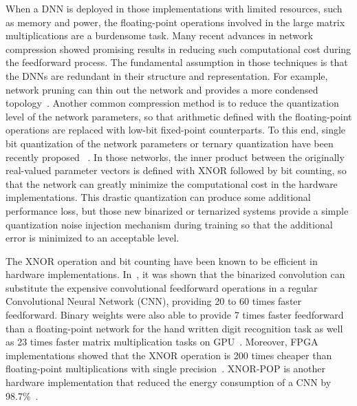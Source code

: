 When a DNN is deployed in those implementations with limited
resources, such as memory and power, the floating-point operations
involved in the large matrix multiplications are a burdensome task.
Many recent advances in network compression showed promising results
in reducing such computational cost during the feedforward
process. The fundamental assumption in those techniques is that the
DNNs are redundant in their structure and representation. For example,
network pruning can thin out the network and provides a more condensed
topology~\cite{han2015deep}.
Another common compression method is to reduce the
quantization level of the network parameters, so that arithmetic
defined with the floating-point operations are replaced with low-bit
fixed-point counterparts. To this end, single bit quantization of the
network parameters or ternary quantization have been recently proposed
~\cite{hwang2014fixed,soudry2014expectation,kim2016bitwise,rastegari2016xnor,hubara2016binarized,beauchamp2006embedded,govindu2004analysis}.
In those networks, the inner product between the
originally real-valued parameter vectors is defined with XNOR followed
by bit counting, so that the network can greatly minimize the
computational cost in the hardware implementations. This drastic
quantization can produce some additional performance loss, but those
new binarized or ternarized systems provide a simple quantization
noise injection mechanism during training so that the additional error
is minimized to an acceptable level.

The XNOR operation and bit counting have been known to be efficient in
hardware implementations. In~\cite{rastegari2016xnor}, it was shown
that the binarized convolution can substitute the expensive
convolutional feedforward operations in a regular Convolutional Neural
Network (CNN), %
providing 20 to 60 times faster feedforward. Binary weights were also
able to provide 7 times faster feedforward than a floating-point
network for the hand written digit recognition task as well as 23
times faster matrix multiplication tasks on
GPU~\cite{hubara2016binarized}.
Moreover, FPGA implementations showed that the XNOR operation is 200
times cheaper than floating-point multiplications with 
single precision~\cite{beauchamp2006embedded,govindu2004analysis}.
XNOR-POP is another hardware implementation that reduced
the energy consumption of a CNN by 98.7\%~\cite{jiang2017xnor}.

  
